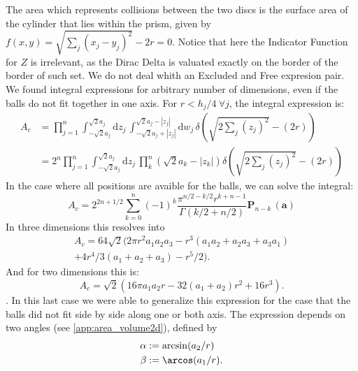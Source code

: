 \documentclass[superscriptaddress,pre,reprint,showpacs,twocolumn]{revtex4-1}
\newcommand{\rd}[1]{\mathrm{d}{#1} \,}
\newcommand{\sumprod}[1]{\mathbf{P}_{#1} \,}
\begin{document}
The area which represents collisions between the two discs is the surface area of the cylinder
that lies within the prism, given by
$f(x,y) = \sqrt{\sum_j (x_j-y_j)^2} -2r=0$.
Notice that here the Indicator Function for $Z$ is irrelevant, as
the Dirac Delta is valuated exactly on the border of the border
of such set. We do not deal whith an Excluded and Free expresion pair.
 We found integral expressions for
arbitrary number of dimensions, even if the balls do not fit
together in one axis.
For $r<h_j/4 \: \forall j$, the integral expression is:
\begin{equation}
  \begin{split}
  A_{c} & =  \prod_{j=1}^n\int_{-\sqrt{2}a_j}^{\sqrt{2}a_j} \rd{z_j}
  \int_{-\sqrt{2}a_j+|z_j|}^{\sqrt{2}a_j-|z_j|} \rd{w_j}
  \delta (\sqrt{2 \sum_j (z_j)^2} - (2r)) \\
  & = 2^n \prod_{j=1}^n\int_{-\sqrt{2}a_j}^{\sqrt{2}a_j} \rd{z_j}
  \prod_k^n(\sqrt{2} a_k -|z_k|)
  \delta (\sqrt{2 \sum_j (z_j)^2} - (2r))
  \end{split}
\end{equation}
In the case where all positions are avaible for the balls, we can solve
the integral:
\begin{equation}
  A_{c}=  2^{2n+1/2} \sum_{k=0}^{n} (-1)^k
  \frac{\pi^{n/2-k/2} r^{k+n-1}}{\Gamma(k/2+n/2)}
  \sumprod{n-k}(\mathbf{a}) 
\end{equation}
In three dimensions
this resolves into
\begin{equation}\label{col3dnormal}
   \begin{split}
     A_{c}=64 \sqrt{2} \big(2 \pi r^2 a_1a_2a_3 
      - r^3 (a_1a_2 +a_2a_3 + a_3 a_1) \\
  +4r^4/3 (a_1+a_2+a_3)
  -r^5/2 \big).
  \end{split}
\end{equation}
And for two dimensions this is:
\begin{equation}\label{AreaChoque}
A_{c}  =  \sqrt{2} (
16\pi a_1 a_2 r -32 (a_1+a_2)r^2 +16 r^3).
\end{equation}.
In this last case we were able to generalize this expression for
the case that the balls did not fit side by side along one or both
axis. The  expression depends on two angles
(see \ref{app:area_volume2d}), defined by
\begin{equation}\label{angulos2d}
 \begin{aligned}
\alpha & :=\arcsin(a_2/r) \\
\beta & := \arcos(a_1/r) .\\
  \end{aligned}
\end{equation}
\end{document}
